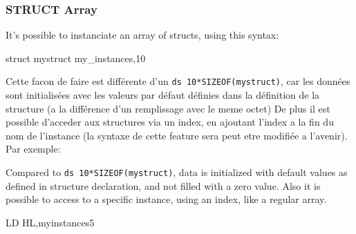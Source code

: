 \begin{xen}
\subsubsection{STRUCT Array}
It's possible to instanciate an array of structs, using this syntax:
\end{xen}

\begin{code}
    struct mystruct my\_instances,10
\end{code}

\begin{xfr}
Cette facon de faire est différente d'un \texttt{ds 10*SIZEOF(mystruct)}, car les données sont initialisées avec les valeurs par défaut définies dans la définition de la structure (a la différence d'un remplissage avec le meme octet)
De plus il est possible d'acceder aux structures via un index, en ajoutant l'index a la fin du nom de l'instance (la syntaxe de cette feature sera peut etre modifiée a l'avenir). Par exemple:
\end{xfr}

\begin{xen}
Compared to \texttt{ds 10*SIZEOF(mystruct)}, data is initialized with default values as defined in structure declaration, and not filled with a zero value.
Also it is possible to access to a specific instance, using an index, like a regular array.
\end{xen}

\begin{code}
  LD HL,myinstances5
\end{code}
